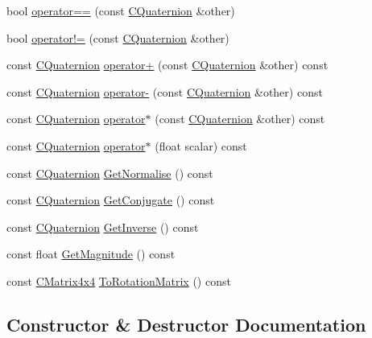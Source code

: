 \begin{DoxyCompactItemize}
\item 
bool \hyperlink{class_slim_1_1_c_quaternion_ae702da6dd85b8520fcd969ff425df1ab}{operator==} (const \hyperlink{class_slim_1_1_c_quaternion}{C\+Quaternion} \&other)
\item 
bool \hyperlink{class_slim_1_1_c_quaternion_a6f5fd7a33993d47eae16eaf987503616}{operator!=} (const \hyperlink{class_slim_1_1_c_quaternion}{C\+Quaternion} \&other)
\item 
const \hyperlink{class_slim_1_1_c_quaternion}{C\+Quaternion} \hyperlink{class_slim_1_1_c_quaternion_a1d10b8aef87ed8578fe17fe8b690c41e}{operator+} (const \hyperlink{class_slim_1_1_c_quaternion}{C\+Quaternion} \&other) const 
\item 
const \hyperlink{class_slim_1_1_c_quaternion}{C\+Quaternion} \hyperlink{class_slim_1_1_c_quaternion_a4f39555697a07dd6b082ab9ae45cd527}{operator-\/} (const \hyperlink{class_slim_1_1_c_quaternion}{C\+Quaternion} \&other) const 
\item 
const \hyperlink{class_slim_1_1_c_quaternion}{C\+Quaternion} \hyperlink{class_slim_1_1_c_quaternion_af617fcc60aab13aa7e3a2babcf86a18b}{operator$\ast$} (const \hyperlink{class_slim_1_1_c_quaternion}{C\+Quaternion} \&other) const 
\item 
const \hyperlink{class_slim_1_1_c_quaternion}{C\+Quaternion} \hyperlink{class_slim_1_1_c_quaternion_ad7d286d57f99599784f38d5d19f20c8c}{operator$\ast$} (float scalar) const 
\item 
const \hyperlink{class_slim_1_1_c_quaternion}{C\+Quaternion} \hyperlink{class_slim_1_1_c_quaternion_afea39fd5c5606cc33f333bc557c28fac}{Get\+Normalise} () const 
\item 
const \hyperlink{class_slim_1_1_c_quaternion}{C\+Quaternion} \hyperlink{class_slim_1_1_c_quaternion_ac745bca24979214bcf3e2168b7ec8dcf}{Get\+Conjugate} () const 
\item 
const \hyperlink{class_slim_1_1_c_quaternion}{C\+Quaternion} \hyperlink{class_slim_1_1_c_quaternion_af6968149423a919825257d5ab48937ca}{Get\+Inverse} () const 
\item 
const float \hyperlink{class_slim_1_1_c_quaternion_ab2ab086de3a1807123757595cdabd906}{Get\+Magnitude} () const 
\item 
const \hyperlink{class_slim_1_1_c_matrix4x4}{C\+Matrix4x4} \hyperlink{class_slim_1_1_c_quaternion_aa128721304f429ea52bee5097557644c}{To\+Rotation\+Matrix} () const 
\end{DoxyCompactItemize}


\subsection{Constructor \& Destructor Documentation}
\hypertarget{class_slim_1_1_c_quaternion_a6b203d70c2539992936e128f10af4943}{}
